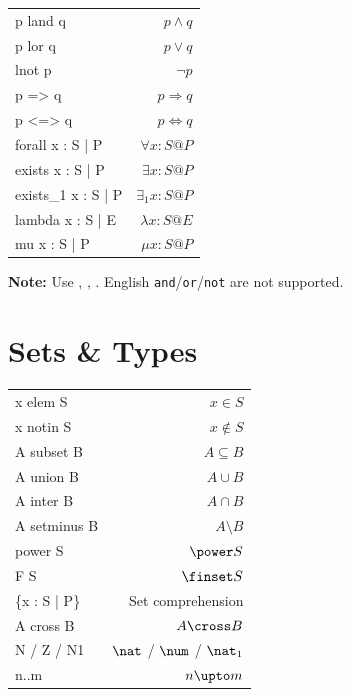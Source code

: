 \begin{tabularx}{\columnwidth}{LR}
p land q             & $p \land q$ \\
p lor q              & $p \lor q$ \\
lnot p               & $\lnot p$ \\
p => q               & $p \Rightarrow q$ \\
p <=> q              & $p \Leftrightarrow q$ \\
forall x : S | P     & $\forall x : S @ P$ \\
exists x : S | P     & $\exists x : S @ P$ \\
exists\_1 x : S | P  & $\exists_1 x : S @ P$ \\
lambda x : S | E     & $\lambda x : S @ E$ \\
mu x : S | P         & $\mu x : S @ P$ \\
\end{tabularx}

\smallskip
{\footnotesize\textbf{Note:} Use , , . English \texttt{and}/\texttt{or}/\texttt{not} are not supported.}

\section{Sets \& Types}

\begin{tabularx}{\columnwidth}{LR}
x elem S             & $x \in S$ \\
x notin S            & $x \notin S$ \\
A subset B           & $A \subseteq B$ \\
A union B            & $A \cup B$ \\
A inter B            & $A \cap B$ \\
A setminus B         & $A \setminus B$ \\
power S              & $\power S$ \\
F S                  & $\finset S$ \\
\{x : S | P\}       & Set comprehension \\
A cross B            & $A \cross B$ \\
N / Z / N1           & $\nat$ / $\num$ / $\nat_1$ \\
n..m                 & $n \upto m$ \\
\end{tabularx}

